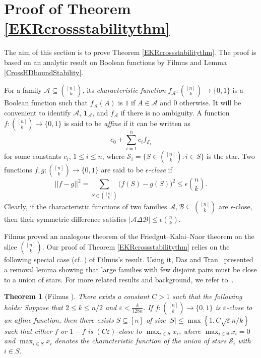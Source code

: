 \documentclass[11pt]{article}
\numberwithin{equation}{section}
\newtheorem{theorem}{Theorem}[section]
\def\A{\mathcal{A}}
\def\B{\mathcal{B}}
\def\S{\mathcal{S}}
\def\1{\mathbf{1}}
\begin{document}
\section{Proof of Theorem \ref{EKRcrossstabilitythm}}

The aim of this section is to prove Theorem \ref{EKRcrossstabilitythm}.
The proof is based on an analytic result on Boolean functions by Filmus \cite{Filmus} and Lemma \ref{CrossHDboundStability}.

For a  family  $\A \subseteq \binom{[n]}{k}$, its {\em characteristic function}
$f_\A:\binom{[n]}{k}\to \{0,1\}$ is a Boolean function such that
$f_\A(A)$ is $1$ if $A\in\A$ and $0$ otherwise.
It will be convenient to identify $\A$, $\1_\A$, and $f_\A$ if there is no ambiguity.
A function $f :\binom{[n]}{k}\to \{0,1\}$ is said to be {\em affine}
if it can be written as %
$$c_0 +\sum_{i=1}^n c_i f_{\S_i}$$
for some constants $c_i$, $1\leq i \leq n$, where
$\S_i=\{S\in \binom{[n]}{k}: i\in S\}$ is the star.
Two functions $f,g:\binom{[n]}{k} \to \{0, 1\}$ are said to be
{\em $\epsilon$-close} if
$$||f-g||^2=\sum_{S \in \binom{[n]}{k}} \big(f(S)-g(S)\big)^2
\leq \epsilon \binom{n}{k}.$$
Clearly, if the characteristic functions of two families
$\A, \B\subseteq \binom{[n]}{k}$ are $\epsilon$-close, then their symmetric difference satisfies $|\A \Delta \B|\leq \epsilon \binom{n}{k}.$




Filmus \cite[Theorem 3.1]{Filmus} proved an analogous theorem of the Friedgut--Kalai--Naor theorem \cite{Friedgut} on the slice $\binom{[n]}{k}$.
Our proof of Theorem \ref{EKRcrossstabilitythm} relies on the following special case (cf. \cite[Theorem~6]{Das}) of Filmus's result.
Using it,
Das and Tran~\cite[Theorem 2]{Das} presented a removal lemma showing that large families with few disjoint pairs must be close to a union of stars.
For more related results and background, we refer to~\cite{Filmus,FilmusCPC}.


\begin{theorem}[Filmus \cite{Filmus}]\label{FNKthninkslice}
There exists a constant $C>1$ such that the following holds:
Suppose that $2\leq k\leq n/2$ and $\varepsilon<  \frac{k}{128n}$.
If $f:\binom{[n]}{k}\to \{0,1\}$ is $\varepsilon$-close to an affine function,
then there exists $S\subseteq [n]$ of size
$|S|\leq \max\left\{1, C \sqrt{\varepsilon}n/k \right\}$ such that either $f$ or $1-f$ is $(C\varepsilon)$-close to $\max_{i\in S} x_i$,
where $\max_{i\in \emptyset} x_i=0$ and $\max_{i\in S} x_i$ denotes the characteristic function of
the union of stars $\S_i$ with $i\in S$.
\end{theorem}
\end{document}
